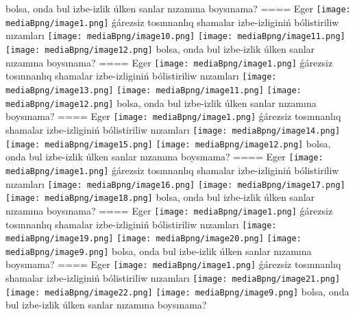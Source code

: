 bolsa, onda bul izbe-izlik úlken sanlar nızamına boysınama?
====
Eger \texttt{[image: mediaBpng/image1.png]} ǵárezsiz tosınnanlıq shamalar izbe-izliginiń bólistiriliw nızamları
\texttt{[image: mediaBpng/image10.png]} \texttt{[image: mediaBpng/image11.png]} \texttt{[image: mediaBpng/image12.png]}
bolsa, onda bul izbe-izlik úlken sanlar nızamına boysınama?
====
Eger \texttt{[image: mediaBpng/image1.png]} ǵárezsiz tosınnanlıq shamalar izbe-izliginiń bólistiriliw nızamları
\texttt{[image: mediaBpng/image13.png]} \texttt{[image: mediaBpng/image11.png]} \texttt{[image: mediaBpng/image12.png]}
bolsa, onda bul izbe-izlik úlken sanlar nızamına boysınama?
====
Eger \texttt{[image: mediaBpng/image1.png]} ǵárezsiz tosınnanlıq shamalar izbe-izliginiń bólistiriliw nızamları
\texttt{[image: mediaBpng/image14.png]} \texttt{[image: mediaBpng/image15.png]} \texttt{[image: mediaBpng/image12.png]}
bolsa, onda bul izbe-izlik úlken sanlar nızamına boysınama?
====
Eger \texttt{[image: mediaBpng/image1.png]} ǵárezsiz tosınnanlıq shamalar izbe-izliginiń bólistiriliw nızamları
\texttt{[image: mediaBpng/image16.png]} \texttt{[image: mediaBpng/image17.png]} \texttt{[image: mediaBpng/image18.png]}
bolsa, onda bul izbe-izlik úlken sanlar nızamına boysınama?
====
Eger \texttt{[image: mediaBpng/image1.png]} ǵárezsiz tosınnanlıq shamalar izbe-izliginiń bólistiriliw nızamları
\texttt{[image: mediaBpng/image19.png]} \texttt{[image: mediaBpng/image20.png]} \texttt{[image: mediaBpng/image9.png]}
bolsa, onda bul izbe-izlik úlken sanlar nızamına boysınama?
====
Eger \texttt{[image: mediaBpng/image1.png]} ǵárezsiz tosınnanlıq shamalar izbe-izliginiń bólistiriliw nızamları
\texttt{[image: mediaBpng/image21.png]} \texttt{[image: mediaBpng/image22.png]} \texttt{[image: mediaBpng/image9.png]}
bolsa, onda bul izbe-izlik úlken sanlar nızamına boysınama?
